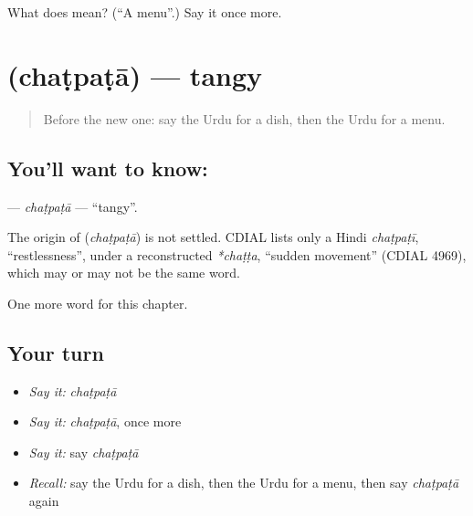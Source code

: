 \begin{tcolorbox}[breakable,colback=teal!4,colframe=teal!35!black,title={Before you move on}]
What does  mean? (\textquotedblleft{}A menu\textquotedblright{}.) Say it once more.
\end{tcolorbox}
\section[\texorpdfstring{\ur{چٹپٹا} (chaṭpaṭā)}{چٹپٹا (chaṭpaṭā)}]{ (chaṭpaṭā) — tangy}

\label{lesson:UR-C259-chatpata}



\begin{quote}
Before the new one: say the Urdu for a dish, then the Urdu for a menu.
\end{quote}

\subsection*{You'll want to know: }
\textbf{} — \emph{chaṭpaṭā} — \textquotedblleft{}tangy\textquotedblright{}.

\begin{cousinweb}
The origin of \textbf{} (\emph{chaṭpaṭā}) is not settled. CDIAL lists only a Hindi \emph{chaṭpaṭī}, \textquotedblleft{}restlessness\textquotedblright{}, under a reconstructed \emph{*chaṭṭa}, \textquotedblleft{}sudden movement\textquotedblright{} (CDIAL 4969), which may or may not be the same word.
\end{cousinweb}

\begin{grammarlens}[title={What you've built}]
One more word for this chapter.
\end{grammarlens}

\subsection*{Your turn}
\begin{itemize}
\raggedright
  \item \emph{Say it:} \emph{chaṭpaṭā}
  \item \emph{Say it:} \emph{chaṭpaṭā}, once more
  \item \emph{Say it:} say \emph{chaṭpaṭā}
  \item \emph{Recall:} say the Urdu for a dish, then the Urdu for a menu, then say \emph{chaṭpaṭā} again
\end{itemize}

